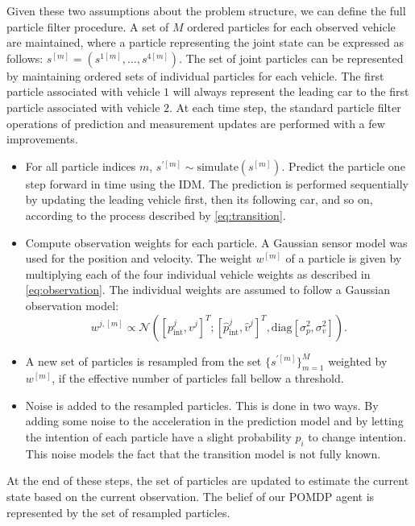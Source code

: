 Given these two assumptions about the problem structure, we can define the full particle filter procedure. A set of $M$ ordered particles for each observed vehicle are maintained, where a particle representing the joint state can be expressed as follows: $s^{[m]} = (s^{1[m]}, \ldots, s^{4[m]})$. The set of joint particles can be represented by maintaining ordered sets of individual particles for each vehicle. The first particle associated with vehicle $1$ will always represent the leading car to the first particle associated with vehicle $2$. %
At each time step, the standard particle filter operations of prediction and measurement updates are performed with a few improvements.  
\begin{itemize}
    \item For all particle indices $m$, $s^{\prime[m]}\sim\text{simulate}(s^{[m]})$. Predict the particle one step forward in time using the IDM. The prediction is performed sequentially by updating the leading vehicle first, then its following car, and so on, according to the process described by \ref{eq:transition}.
    \item Compute observation weights for each particle. A Gaussian sensor model was used for the position and velocity. The weight $w^{[m]}$ of a particle is given by multiplying each of the four individual vehicle weights as described in \ref{eq:observation}. The individual weights are assumed to follow a Gaussian observation model: 
    \begin{equation}
        w^{j,[m]} \propto \mathcal{N}([p^j_{\text{int}}, v^j]^T ; [\hat{p}^j_\text{int}, \hat{v}^j]^T, \mathrm{diag}[\sigma_p^2, \sigma_v^2]).
    \end{equation}
    \item A new set of particles is resampled from the set $\{s^{\prime[m]}\}^M_{m=1}$ weighted by $w^{[m]}$, if the effective number of particles fall bellow a threshold. 
    \item Noise is added to the resampled particles. This is done in two ways. By adding some noise to the acceleration in the prediction model and by letting the intention of each particle have a slight probability $p_i$ to change intention. 
    This noise models the fact that the transition model is not fully known. 
\end{itemize}
At the end of these steps, the set of particles are updated to estimate the current state based on the current observation. The belief of our POMDP agent is represented by the set of resampled particles. 

